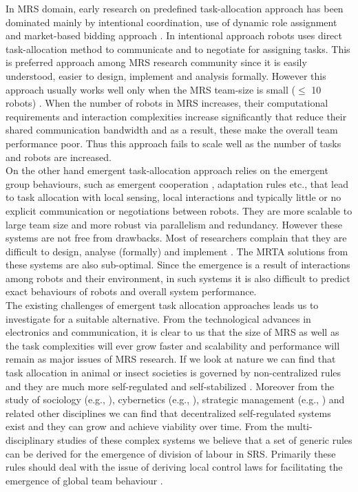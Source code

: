 \documentclass{llncs}
\begin{document}
In MRS domain, early research on predefined task-allocation approach has been dominated mainly by intentional coordination,  use of dynamic role assignment \cite{Parker2008} and market-based bidding approach \cite{Dias+2006}. In intentional approach  robots uses direct task-allocation method to communicate and to negotiate for assigning tasks. This is preferred approach among MRS research community since it is easily understood, easier to design, implement and analysis formally. However this approach usually works well only when the MRS team-size is small ($ \leq $ 10 robots) \cite{Lerman+2006}. When the number of robots in MRS increases, their computational requirements and interaction complexities increase significantly that reduce their shared communication bandwidth and as a result, these make the overall team performance poor. Thus this approach fails to scale well as the number of tasks and robots are increased.\\ 
On the other hand emergent task-allocation approach relies on the emergent group behaviours, such as emergent cooperation \cite{Lerman+2006}, adaptation rules \cite{Liu+2007} etc., that lead to task allocation with local sensing, local interactions and typically little or no explicit communication or negotiations between robots. They are more scalable to large team size and more robust via parallelism and redundancy. However these systems are not free from drawbacks. Most of researchers complain that they are difficult to design, analyse (formally) and implement \cite{Gerkey+2004,Lerman+2006}. The MRTA solutions from these systems are also sub-optimal. Since the emergence is a result of interactions among robots and their environment, in such systems it is also difficult to predict exact behaviours of robots and overall system performance.\\
The existing challenges of emergent task allocation approaches leads us to investigate for a suitable alternative. From the technological advances in electronics and communication, it is clear to us that the size of MRS as well as the task complexities will ever grow faster and scalability and performance will remain as major issues of MRS research. If we look at nature we can find that task allocation in animal or insect societies is governed by non-centralized rules and they are much more self-regulated and self-stabilized \cite{Camazine+2001,Bonabeau+1999}. Moreover from the study of sociology (e.g., \cite{Sayer+1992}), cybernetics (e.g., \cite{Beer1981}), strategic management (e.g., \cite{Kogut2000}) and related other disciplines we can find that decentralized self-regulated systems exist and they can grow and achieve viability over time. From the multi-disciplinary studies of these complex systems we believe that a set of generic rules can be derived for the emergence of division of labour in SRS. Primarily these rules should deal with the issue of deriving local control laws for facilitating the emergence of global team behaviour \cite{Parker2008}.\\
\end{document}
